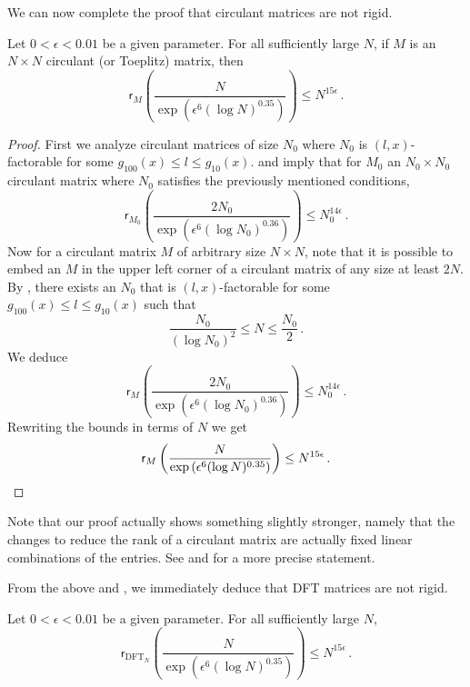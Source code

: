 \documentclass{toc}
\DeclareMathOperator{\DFT}{DFT}
\begin{document}
We can now complete the proof that %
%
 circulant matrices are not rigid. 
\begin{theorem}\label{main_circulant}
Let $0 < \epsilon < 0.01$ be a given parameter.  For all sufficiently 
large $N$, if $M$ is an $N \times N$ %
circulant (or Toeplitz) %
matrix, then %
\[
\textsf{r}_{M}\left(\frac{N}{\exp\left(\epsilon^6(\log N)^{0.35}\right)}\right) \leq N^{15 \epsilon} \,.
\]
\end{theorem}
\begin{proof}
First we analyze circulant matrices of size $N_0$ where $N_0$ is $(l,x)$-factorable for some $g_{100}(x) \leq l \leq g_{10}(x)$.   and  imply that for $M_0$ an $N_0 \times N_0$ circulant matrix where $N_0$ satisfies the previously mentioned 
%
conditions, %
\[
\textsf{r}_{M_0}\left(\frac{2N_0}{\exp\left(\epsilon^6(\log N_0)^{0.36}\right)}\right) \leq N_0^{14 \epsilon} \,.
\]
Now for a circulant matrix $M$ of arbitrary size $N \times N$, note that it is possible to embed an $M$ in the upper left corner of a circulant matrix of any size at least $2N$.  By , there exists an $N_0$ that is $(l,x)$-factorable for some $g_{100}(x) \leq l \leq g_{10}(x)$ such that
\[
\frac{N_0}{(\log N_0)^2} \leq N \leq \frac{N_0}{2} \,.
\]
We deduce
\[
\textsf{r}_{M}\left(\frac{2N_0}{\exp\left(\epsilon^6(\log N_0)^{0.36}\right)}\right) \leq N_0^{14 \epsilon} \,.
\]
Rewriting the bounds in terms of $N$ we get
\[
\textsf{r}_{M}\left(\frac{N}{\exp\left(\epsilon^6(\log N)^{0.35}\right)}\right) \leq N^{15 \epsilon} \,. \qedhere
\]
\end{proof}
\begin{remark}
Note that our proof actually shows something slightly stronger, namely that the changes to reduce the rank of a circulant matrix are actually fixed linear combinations of the entries.  See  and  for a more precise statement.
\end{remark}
{}From the above and , we immediately deduce that %
DFT %
 matrices are not rigid.
\begin{theorem}\label{full_fourier}
Let $0 < \epsilon < 0.01$ be a given parameter.  For all sufficiently large $N$,
%
%
%
 \[
\textsf{r}_{\DFT_N}\left(\frac{N}{\exp\left(\epsilon^6(\log N)^{0.35}\right)}\right) \leq N^{15 \epsilon} \,.
\]
\end{theorem}

%
\end{document}
